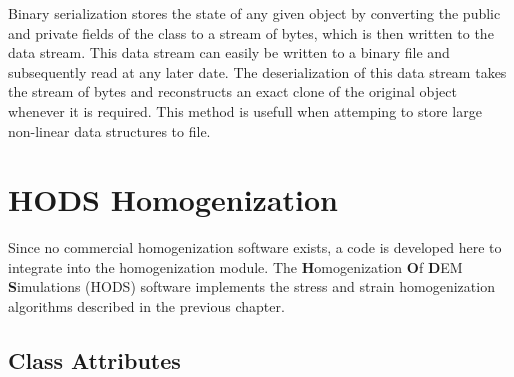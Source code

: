 Binary serialization stores the state of any given object by converting the public and private fields of the class to a stream of bytes, which is then written to the data stream. This data stream can easily be written to a binary file and subsequently read at any later date. The deserialization of this data stream takes the stream of bytes and reconstructs an exact clone of the original object whenever it is required. This method is usefull when attemping to store large non-linear data structures to file.



\section{HODS Homogenization}

Since no commercial homogenization software exists, a code is developed here to integrate into the homogenization module. The \textbf{H}omogenization \textbf{O}f \textbf{D}EM \textbf{S}imulations (HODS) software implements the stress and strain homogenization algorithms described in the previous chapter. 


\subsection{Class Attributes}



